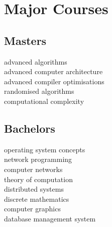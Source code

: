 
\newpage %

\begin{minipage}[t]{0.32\textwidth} %

\sectionspace %

\section{Major Courses}
\subsection{Masters}
advanced algorithms \\
advanced computer architecture \\
advanced compiler optimisations \\
randomised algorithms \\
computational complexity \\
\sectionspace

\subsection{Bachelors}
operating system concepts \\
network programming \\
computer networks \\
theory of computation \\
distributed systems \\
discrete mathematics \\
computer graphics \\
database management system \\



\sectionspace


\end{minipage} %
\hfill
